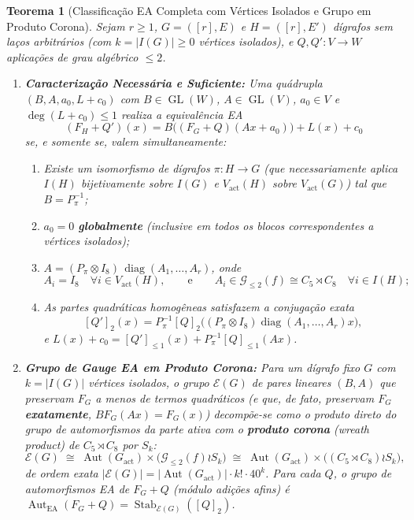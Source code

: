 \documentclass[11pt,a4paper]{article}
\newtheorem{theorem}{Teorema}[section]
\theoremstyle{definition}
\theoremstyle{remark}
\newcommand{\Aut}{\operatorname{Aut}}
\newcommand{\Stab}{\operatorname{Stab}}
\newcommand{\GL}{\operatorname{GL}}
\begin{document}
\begin{theorem}[Classificação EA Completa com Vértices Isolados e Grupo em Produto Corona]\label{thm:c1_isolated}
Sejam $r \ge 1$, $G = ([r], E)$ e $H = ([r], E')$ dígrafos sem laços arbitrários (com $k = |I(G)| \ge 0$ vértices isolados), e $Q, Q' : V \to W$ aplicações de grau algébrico $\le 2$.
\begin{enumerate}
  \item \textbf{Caracterização Necessária e Suficiente:} Uma quádrupla $(B, A, a_0, L + c_0)$ com $B \in \GL(W)$, $A \in \GL(V)$, $a_0 \in V$ e $\deg(L+c_0) \le 1$ realiza a equivalência EA
  \begin{equation}\label{eq:ea_rel}
    (F_H + Q')(x) = B\big((F_G + Q)(Ax + a_0)\big) + L(x) + c_0
  \end{equation}
  se, e somente se, valem simultaneamente:
  \begin{enumerate}
    \item[(i)] Existe um isomorfismo de dígrafos $\pi : H \to G$ (que necessariamente aplica $I(H)$ bijetivamente sobre $I(G)$ e $V_{\mathrm{act}}(H)$ sobre $V_{\mathrm{act}}(G)$) tal que $B = P_\pi^{-1}$;
    \item[(ii)] $a_0 = 0$ \textbf{globalmente} (inclusive em todos os blocos correspondentes a vértices isolados);
    \item[(iii)] $A = (P_\pi \otimes I_8)\,\operatorname{diag}(A_1, \dots, A_r)$, onde
    \[
      A_i = I_8 \quad \forall i \in V_{\mathrm{act}}(H), \qquad\text{e}\qquad A_i \in \mathcal{G}_{\le 2}(f) \cong C_5 \rtimes C_8 \quad \forall i \in I(H);
    \]
    \item[(iv)] As partes quadráticas homogêneas satisfazem a conjugação exata
    \begin{equation}\label{eq:quad_conj_iso}
      [Q']_2(x) = P_\pi^{-1} [Q]_2\big((P_\pi \otimes I_8)\operatorname{diag}(A_1,\dots,A_r) x\big),
    \end{equation}
    e $L(x) + c_0 = [Q']_{\le 1}(x) + P_\pi^{-1}[Q]_{\le 1}(Ax)$.
  \end{enumerate}
  \item \textbf{Grupo de Gauge EA em Produto Corona:} Para um dígrafo fixo $G$ com $k = |I(G)|$ vértices isolados, o grupo $\mathcal{E}(G)$ de pares lineares $(B, A)$ que preservam $F_G$ a menos de termos quadráticos (e que, de fato, preservam $F_G$ \textbf{exatamente}, $B F_G(Ax) = F_G(x)$) decompõe-se como o produto direto do grupo de automorfismos da parte ativa com o \textbf{produto corona} (\emph{wreath product}) de $C_5 \rtimes C_8$ por $S_k$:
  \begin{equation}\label{eq:wreath_group}
    \mathcal{E}(G) \;\cong\; \Aut(G_{\mathrm{act}}) \times \big(\mathcal{G}_{\le 2}(f) \wr S_k\big) \;\cong\; \Aut(G_{\mathrm{act}}) \times \big((C_5 \rtimes C_8) \wr S_k\big),
  \end{equation}
  de ordem exata $|\mathcal{E}(G)| = |\Aut(G_{\mathrm{act}})| \cdot k! \cdot 40^k$. Para cada $Q$, o grupo de automorfismos EA de $F_G+Q$ (módulo adições afins) é $\Aut_{\mathrm{EA}}(F_G+Q) = \Stab_{\mathcal{E}(G)}([Q]_2)$.
\end{enumerate}
\end{theorem}
\end{document}
